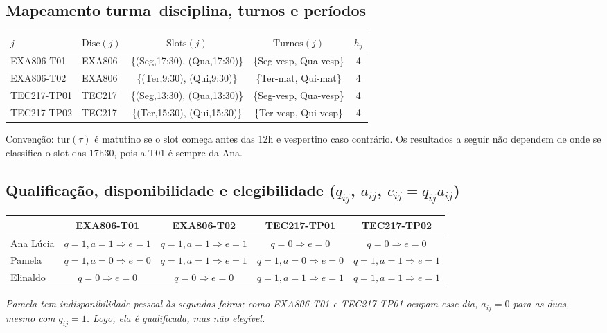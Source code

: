 \documentclass[11pt,a4paper]{article}
\begin{document}
\subsection{Mapeamento turma--disciplina, turnos e períodos}
\begin{center}
\small
\begin{tabular}{llccc}
\toprule
$j$ & $\text{Disc}(j)$ & $\text{Slots}(j)$ & $\text{Turnos}(j)$ & $h_j$ \\
\midrule
EXA806-T01  & EXA806 & \{(Seg,17:30), (Qua,17:30)\} & \{Seg-vesp, Qua-vesp\} & 4 \\
EXA806-T02  & EXA806 & \{(Ter,9:30), (Qui,9:30)\}   & \{Ter-mat, Qui-mat\}   & 4 \\
TEC217-TP01 & TEC217 & \{(Seg,13:30), (Qua,13:30)\} & \{Seg-vesp, Qua-vesp\} & 4 \\
TEC217-TP02 & TEC217 & \{(Ter,15:30), (Qui,15:30)\} & \{Ter-vesp, Qui-vesp\} & 4 \\
\bottomrule
\end{tabular}
\end{center}
Convenção: $\text{tur}(\tau)$ é matutino se o slot começa antes das 12h e vespertino caso contrário. Os resultados a seguir não dependem de onde se classifica o slot das 17h30, pois a T01 é sempre da Ana.

\subsection{Qualificação, disponibilidade e elegibilidade ($q_{ij}$, $a_{ij}$, $e_{ij}=q_{ij}a_{ij}$)}
\begin{center}
\small
\begin{tabular}{lcccc}
\toprule
 & EXA806-T01 & EXA806-T02 & TEC217-TP01 & TEC217-TP02 \\
\midrule
Ana Lúcia & $q{=}1,a{=}1\Rightarrow e{=}1$ & $q{=}1,a{=}1\Rightarrow e{=}1$ & $q{=}0\Rightarrow e{=}0$ & $q{=}0\Rightarrow e{=}0$ \\
Pamela    & $q{=}1,a{=}0\Rightarrow e{=}0$ & $q{=}1,a{=}1\Rightarrow e{=}1$ & $q{=}1,a{=}0\Rightarrow e{=}0$ & $q{=}1,a{=}1\Rightarrow e{=}1$ \\
Elinaldo  & $q{=}0\Rightarrow e{=}0$ & $q{=}0\Rightarrow e{=}0$ & $q{=}1,a{=}1\Rightarrow e{=}1$ & $q{=}1,a{=}1\Rightarrow e{=}1$ \\
\bottomrule
\end{tabular}
\end{center}
\emph{Pamela tem indisponibilidade pessoal às segundas-feiras; como EXA806-T01 e TEC217-TP01 ocupam esse dia, $a_{ij}=0$ para as duas, mesmo com $q_{ij}=1$. Logo, ela é qualificada, mas não elegível.}
\end{document}
